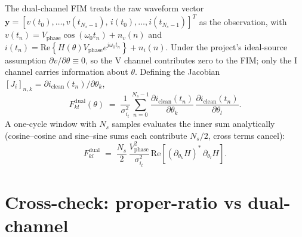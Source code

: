 \documentclass[11pt,a4paper]{article}
\begin{document}
The dual-channel FIM treats the raw waveform vector
$\mathbf{y} = [v(t_0),\ldots,v(t_{N_s-1}),\,i(t_0),\ldots,i(t_{N_s-1})]^T$
as the observation, with
$v(t_n) = V_{\mathrm{phase}}\cos(\omega_0 t_n) + n_v(n)$ and
$i(t_n) = \mathrm{Re}\!\left\{H(\theta) V_{\mathrm{phase}}
e^{j\omega_0 t_n}\right\} + n_i(n)$.  Under the project's
ideal-source assumption $\partial v/\partial \theta \equiv 0$, so the
V channel contributes zero to the FIM; only the I channel carries
information about $\theta$.  Defining the Jacobian
$[J_i]_{n,k} = \partial i_{\mathrm{clean}}(t_n)/\partial \theta_k$,
\begin{equation}
   F^{\mathrm{dual}}_{kl}(\theta)
       \;=\; \frac{1}{\sigma_{i_t}^2}
             \sum_{n=0}^{N_s-1}
                 \frac{\partial i_{\mathrm{clean}}(t_n)}{\partial \theta_k}\,
                 \frac{\partial i_{\mathrm{clean}}(t_n)}{\partial \theta_l}.
   \label{eq:Fdual}
\end{equation}
A one-cycle window with $N_s$ samples evaluates the inner sum
analytically (cosine--cosine and sine--sine sums each contribute
$N_s/2$, cross terms cancel):
\begin{equation}
   F^{\mathrm{dual}}_{kl}
        \;=\;
        \frac{N_s}{2}\,\frac{V_{\mathrm{phase}}^2}{\sigma_{i_t}^2}\,
        \mathrm{Re}\!\left[
          \left(\partial_{\theta_k} H\right)^{\!*}
          \,\partial_{\theta_l} H
        \right].
   \label{eq:FdualFinal}
\end{equation}

\section{Cross-check: proper-ratio vs dual-channel}
\end{document}
